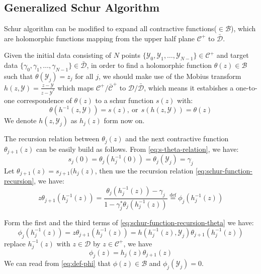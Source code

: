 \documentclass[
	preprint,%
	aps,
	prb,
	showpacs,	
	amsmath, amssymb]{revtex4-2}
\DeclareRobustCommand{\+}{\hstretch{1.25} {\boldsymbol {\mathrel{+}}}}
\newcommand{\Y}{ {\mathcal{Y}} }
\newcommand{\C}{ {\mathcal{C}} }
\newcommand{\Cbar}{ {\bar{\mathcal{C}}} }
\newcommand{\D}{ {\mathcal{D}} }
\newcommand{\Dbar}{ {\bar{\mathcal{D}}} }
\newcommand{\B}{ {\mathcal{B}} }
\begin{document}
\subsection{Generalized Schur Algorithm}
\label{subsec:generalized-schur-algorithm}

Schur algorithm can be modified to expand all contractive 
functions($\in \B$)\cite{adamyan2003reconstruction}, which are
holomorphic functions mapping from the upper half plane $\C^+$ 
to $\Dbar$.

Given the initial data consisting of $N$ points 
$\{\Y_0, \Y_1, \dots ,\Y_{N-1}\} \in \C^+$ and target data
$\{\gamma_0, \gamma_1, \dots ,\gamma_{N-1}\} \in \Dbar$, 
in order to find a holomorphic function $\theta(z) \in \B$ 
such that $\theta(\Y_j) = z_j$ for all $j$, we should make use 
of the Mobius transform $h(z, \Y)  = \frac{z - \Y}{z - \Y^*}$ 
which maps $\C^+/\Cbar^+$ to $\D/\Dbar$, 
which means it estabishes a one-to-one correspondence of $\theta(z)$ 
to a schur function $s(z)$ with:
\begin{equation}\label{eq:s-theta-relation}
	\theta(h^{-1}(z,\Y)) = s(z),\ \mathrm{or} \ \
	s(h(z,\Y)) = \theta(z)
\end{equation}
We denote $h(z, \Y_j)$ as $h_j(z)$ form now on.

The recursion relation between $\theta_j(z)$ and the next contractive 
function $\theta_{j+1}(z)$ can be easily build as follows. From 
\cref{eq:s-theta-relation}, we have:
\begin{equation}\label{eq:s-theta-relation-z0}
	s_j(0) = \theta_j(h_j^{-1}(0)) = \theta_j(\Y_j) = \gamma_j
\end{equation}
Let $\theta_{j+1}(z) = s_{j+1}(h_j(z)$,
then use the recursion relation 
\cref{eq:schur-function-recursion}, we have: 
\begin{equation}\label{eq:schur-function-recursion-theta}
	z\theta_{j+1}(h_j^{-1}(z)) 
	= \frac{\theta_j(h_j^{-1}(z)) 
		- \gamma_j}{1 - \gamma_j^* \theta_j(h_j^{-1}(z))}
	\overset{\mathrm{def}}{=} \phi_j(h_j^{-1}(z))
\end{equation}

Form the first and the third terms of \cref{eq:schur-function-recursion-theta}
we have:
\begin{equation}
	\phi_j(h_j^{-1}(z)) = z\theta_{j+1}(h_j^{-1}(z)) 
	=h(h_j^{-1}(z), \Y_j) \theta_{j+1}(h_j^{-1}(z)) 
\end{equation}
replace $h_j^{-1}(z)$ with $z\in\D$ by $z \in \C^+$, we have
\begin{equation}\label{eq:def-phi}
	\phi_j(z) =h_j(z) \theta_{j+1}(z) 
\end{equation}
We can read from \cref{eq:def-phi} that $\phi(z) \in \B$ 
and $\phi_j(\Y_j) = 0$.
\end{document}

